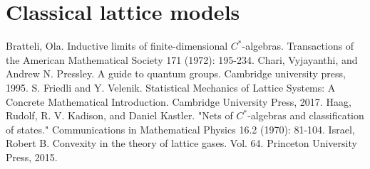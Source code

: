 \documentclass[11pt]{article}%
\theoremstyle{definition}
\theoremstyle{definition}
\theoremstyle{definition}\newtheorem{definition}{Definition}
\theoremstyle{definition} \newtheorem{cntex}{Counterexample}
\theoremstyle{definition}\newtheorem*{acknowledgement}{Acknowledgement}
\theoremstyle{definition}\newtheorem{remark}{Remark}
\theoremstyle{definition}\newtheorem{quest}{Question}
\numberwithin{equation}{section}
\begin{document}
\tableofcontents

\section{Classical lattice models}






\begin{thebibliography}{10}
 Bratteli, Ola. Inductive limits of finite-dimensional $C^*$-algebras. Transactions of the American Mathematical Society 171 (1972): 195-234.\label{bratteli}
 Chari, Vyjayanthi, and Andrew N. Pressley. A guide to quantum groups. Cambridge university press, 1995.
 S. Friedli and Y. Velenik. Statistical Mechanics of Lattice Systems: A Concrete Mathematical Introduction. Cambridge University Press, 2017.
 Haag, Rudolf, R. V. Kadison, and Daniel Kastler. "Nets of $C^*$-algebras and classification of states." Communications in Mathematical Physics 16.2 (1970): 81-104.
 Israel, Robert B. Convexity in the theory of lattice gases. Vol. 64. Princeton University Press, 2015.
\end{thebibliography}
\end{document}
